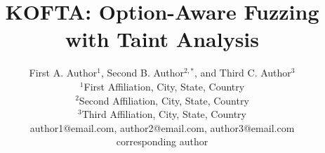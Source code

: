 \documentclass[conference]{IEEEconf}
\newcommand{\paperTitle}{KOFTA: Option-Aware Fuzzing with Taint Analysis}
\begin{document}
\title{\textbf{\Large \paperTitle\\}}

\author{First A. Author$^{1}$, Second B. Author$^{2,*}$, and Third C. Author$^{3}$\\
	\normalsize $^{1}$First Affiliation, City, State, Country\\
	\normalsize $^{2}$Second Affiliation, City, State, Country\\
	\normalsize $^{3}$Third Affiliation, City, State, Country\\
	\normalsize author1@email.com, author2@email.com, author3@email.com\\
	\normalsize *corresponding author
}

\end{document}
